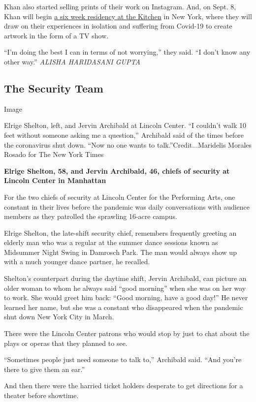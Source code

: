 Khan also started selling prints of their work on Instagram. And, on
Sept. 8, Khan will begin
\href{https://onscreen.thekitchen.org/baseera-khan}{a six week residency
at the Kitchen} in New York, where they will draw on their experiences
in isolation and suffering from Covid-19 to create artwork in the form
of a TV show.

``I'm doing the best I can in terms of not worrying,'' they said. ``I
don't know any other way.'' \emph{ALISHA HARIDASANI GUPTA}

\hypertarget{the-security-team}{%
\subsection{The Security Team}\label{the-security-team}}

Image

Elrige Shelton, left, and Jervin Archibald at Lincoln Center. ``I
couldn't walk 10 feet without someone asking me a question,'' Archibald
said of the times before the coronavirus shut down. ``Now no one wants
to talk.''Credit...Maridelis Morales Rosado for The New York Times

\textbf{Elrige Shelton, 58, and Jervin Archibald, 46, chiefs of security
at Lincoln Center in Manhattan}

For the two chiefs of security at Lincoln Center for the Performing
Arts, one constant in their lives before the pandemic was daily
conversations with audience members as they patrolled the sprawling
16-acre campus.

Elrige Shelton, the late-shift security chief, remembers frequently
greeting an elderly man who was a regular at the summer dance sessions
known as Midsummer Night Swing in Damrosch Park. The man would always
show up with a much younger dance partner, he recalled.

Shelton's counterpart during the daytime shift, Jervin Archibald, can
picture an older woman to whom he always said ``good morning'' when she
was on her way to work. She would greet him back: ``Good morning, have a
good day!'' He never learned her name, but she was a constant who
disappeared when the pandemic shut down New York City in March.

There were the Lincoln Center patrons who would stop by just to chat
about the plays or operas that they planned to see.

``Sometimes people just need someone to talk to,'' Archibald said. ``And
you're there to give them an ear.''

And then there were the harried ticket holders desperate to get
directions for a theater before showtime.

